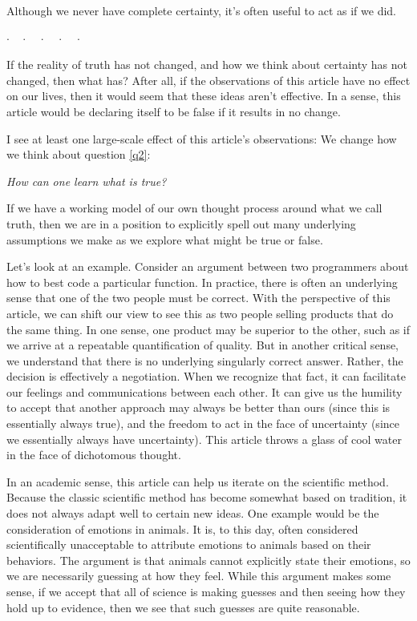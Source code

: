 \documentclass[11pt, oneside]{article}   	%
\newcommand{\dotq}{\cdot\quad}
\newcommand{\scenebreak}{
    \medskip\centerline{$\dotq\dotq\dotq\dotq\cdot$}\medskip
}
\begin{document}
Although we never have complete certainty, it's often useful to act as
if we did.

\scenebreak

If the reality of truth has not changed, and how we think about certainty has
not changed, then what has? After all, if the observations of this
article have no effect on our lives, then it would seem that these ideas aren't
effective. In a sense, this article would be declaring itself to be false if
it results in no change.

I see at least one large-scale effect of this article's observations:
We change how we think about question \ref{q2}:

\centerline{\em How can one learn what is true?}

If we have a working model of our own thought process around what we call truth,
then we are in a position to explicitly spell out many underlying assumptions we
make as we explore what might be true or false.

Let's look at an example. 
Consider an argument between two programmers about how to best code a
particular function.
In practice, there is often an underlying sense that one
of the two people must be correct.
With the perspective of this article, we can
shift our view to see this as two people selling products that do the same
thing.
In one sense, one product may be superior to the other, such as if we
arrive at a repeatable quantification of quality.
But in another critical
sense, we understand that there is no underlying singularly correct answer.
Rather, the decision is effectively a negotiation.
When we recognize that fact, it
can facilitate our feelings and communications between each other.
It can give
us the humility to accept that another approach may always be better than ours
(since this is essentially always true), and the freedom to act in the face of
uncertainty (since we essentially always have uncertainty).
This
article throws
a glass of cool water in the face of dichotomous thought.

In an academic sense, this article can help us iterate on the scientific method.
Because the classic scientific method has become somewhat based on tradition,
it does
not always adapt well to certain new ideas.
One example would be the consideration of emotions in animals.
It is, to this day, often considered scientifically unacceptable to attribute
emotions to animals based on their behaviors. The argument is that animals
cannot explicitly state their emotions, so we are necessarily guessing at how
they feel. While this argument makes some sense, if we accept that all of
science is making guesses and then seeing how they hold up to evidence, then we
see that such guesses are quite reasonable.
\end{document}
